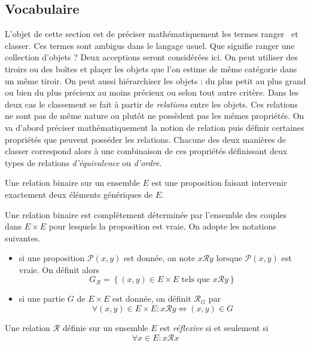 \subsection{Vocabulaire}
L'objet de cette section est de préciser mathématiquement les termes \og ranger\fg~  et \og classer\fg. Ces termes sont ambigus dans le langage usuel. Que signifie ranger une collection d'objets ? Deux acceptions seront considérées ici. \newline
On peut utiliser des tiroirs ou des boîtes et plaçer les objets que l'on estime de même catégorie dans un même tiroir. On peut aussi hiérarchiser les objets : du plus petit au plus grand ou bien du plus précieux au moins précieux ou selon tout autre critère.\newline
 Dans les deux cas le classement se fait à partir de \emph{relations} entre les objets. Ces relations ne sont pas de même nature ou plutôt ne possèdent pas les mêmes propriétés. On va d'abord préciser mathématiquement la notion de relation puis définir certaines propriétés que peuvent posséder les relations. Chacune des deux manières de classer correspond alors à une combinaison de ces propriétés définissant deux types de relations \emph{d'équivalence} ou \emph{d'ordre}.
\begin{defi}
 Une relation binaire sur un ensemble $E$ est une proposition faisant intervenir exactement deux éléments génériques de $E$.
\end{defi}
Une relation binaire est complètement déterminée par l'ensemble des couples dans $E\times E$ pour lesquels la proposition est vraie.\newline
On adopte les notations suivantes.
\begin{itemize}
 \item si une proposition $\mathcal P(x,y)$ est donnée, on note $x\mathcal R y$ lorsque $\mathcal P(x,y)$ est vraie. On définit alors 
\begin{displaymath}
 G_\mathcal R = \left\lbrace (x,y)\in E\times E \text{ tels que } x\mathcal R y \right\rbrace 
\end{displaymath}
\item si une partie $G$ de $E \times E$ est donnée, on définit $\mathcal R_G$ par
\begin{displaymath}
 \forall (x,y)\in E\times E : x \mathcal R y \Leftrightarrow (x,y)\in G
\end{displaymath}
\end{itemize}

 \begin{defi}
  Une relation $\mathcal R$ définie sur un ensemble $E$ est \emph{réflexive} si et seulement si 
\begin{displaymath}
 \forall x\in E : x \mathcal R x
\end{displaymath}
 \end{defi}

